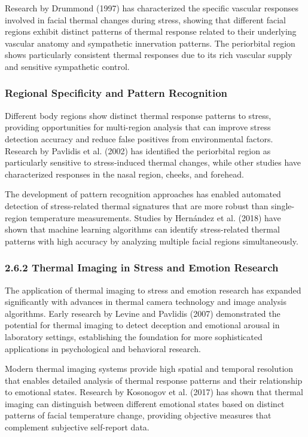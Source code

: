 \documentclass[11pt,a4paper]{article}
\begin{document}
Research by Drummond (1997) has characterized the specific vascular responses involved in facial thermal changes during
stress, showing that different facial regions exhibit distinct patterns of thermal response related to their underlying
vascular anatomy and sympathetic innervation patterns. The periorbital region shows particularly consistent thermal
responses due to its rich vascular supply and sensitive sympathetic control.

\subsubsection{Regional Specificity and Pattern Recognition}

Different body regions show distinct thermal response patterns to stress, providing opportunities for multi-region
analysis that can improve stress detection accuracy and reduce false positives from environmental factors. Research by
Pavlidis et al. (2002) has identified the periorbital region as particularly sensitive to stress-induced thermal
changes, while other studies have characterized responses in the nasal region, cheeks, and forehead.

The development of pattern recognition approaches has enabled automated detection of stress-related thermal signatures
that are more robust than single-region temperature measurements. Studies by Hernández et al. (2018) have shown that
machine learning algorithms can identify stress-related thermal patterns with high accuracy by analyzing multiple facial
regions simultaneously.

\subsubsection{2.6.2 Thermal Imaging in Stress and Emotion Research}

The application of thermal imaging to stress and emotion research has expanded significantly with advances in thermal
camera technology and image analysis algorithms. Early research by Levine and Pavlidis (2007) demonstrated the potential
for thermal imaging to detect deception and emotional arousal in laboratory settings, establishing the foundation for
more sophisticated applications in psychological and behavioral research.

Modern thermal imaging systems provide high spatial and temporal resolution that enables detailed analysis of thermal
response patterns and their relationship to emotional states. Research by Kosonogov et al. (2017) has shown that thermal
imaging can distinguish between different emotional states based on distinct patterns of facial temperature change,
providing objective measures that complement subjective self-report data.
\end{document}
